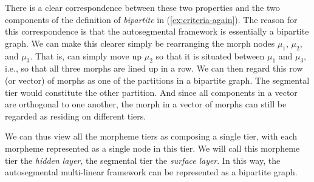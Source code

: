 There is a clear correspondence between these two properties  %
and the two components of the definition of \emph{bipartite} in (\ref{ex:criteria-again}).
The reason for this correspondence is that the autosegmental framework is essentially a bipartite graph. 
We can make this clearer simply be rearranging the morph 
nodes $\mu_1$, $\mu_2$, and $\mu_3$. That is, can 
simply move up $\mu_2$ so that it is situated between 
$\mu_1$ and $\mu_3$, i.e., so that all three morphs are 
lined up in a row. We can then regard this row (or vector) of 
morphs as one of the partitions in a bipartite graph. 
The segmental tier would constitute the other partition. 
And since all components in a vector are orthogonal to one 
another, the morph in a vector of morphs can still be regarded 
as residing on different tiers. %


We can thus view all the morpheme tiers as composing a single tier, 
with each morpheme represented as a single node in this tier.
We will call this morpheme tier the \emph{hidden} \emph{layer}, 
the segmental tier the \emph{surface} \emph{layer}. 
In this way, the autosegmental multi-linear framework can be 
represented as a bipartite graph.

